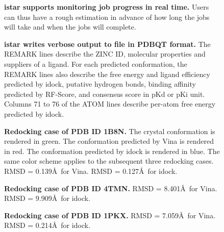 \documentclass[10pt]{article}
\begin{document}
\begin{figure}[!ht]
\begin{center}
\end{center}
\caption{
{\bf istar supports monitoring job progress in real time.} Users can thus have a rough estimation in advance of how long the jobs will take and when the jobs will complete.
}
\label{Progress}
\end{figure}

\begin{figure}[!ht]
\begin{center}
\end{center}
\caption{
{\bf istar writes verbose output to file in PDBQT format.} The REMARK lines describe the ZINC ID, molecular properties and suppliers of a ligand. For each predicted conformation, the REMARK lines also describe the free energy and ligand efficiency predicted by idock, putative hydrogen bonds, binding affinity predicted by RF-Score, and consensus score in pKd or pKi unit. Columns 71 to 76 of the ATOM lines describe per-atom free energy predicted by idock.
}
\label{OutputPDBQT}
\end{figure}

\begin{figure}[!ht]
\begin{center}
\end{center}
\caption{
{\bf Redocking case of PDB ID 1B8N.} The crystal conformation is rendered in green. The conformation predicted by Vina is rendered in red. The conformation predicted by idock is rendered in blue. The same color scheme applies to the subsequent three redocking cases. RMSD = 0.139\AA\ for Vina. RMSD = 0.127\AA\ for idock.
}
\label{Redocking1B8N}
\end{figure}

\begin{figure}[!ht]
\begin{center}
\end{center}
\caption{
{\bf Redocking case of PDB ID 4TMN.} RMSD = 8.401\AA\ for Vina. RMSD = 9.909\AA\ for idock.
}
\label{Redocking4TMN}
\end{figure}

\begin{figure}[!ht]
\begin{center}
\end{center}
\caption{
{\bf Redocking case of PDB ID 1PKX.} RMSD = 7.059\AA\ for Vina. RMSD = 0.214\AA\ for idock.
}
\label{Redocking1PKX}
\end{figure}
\end{document}
